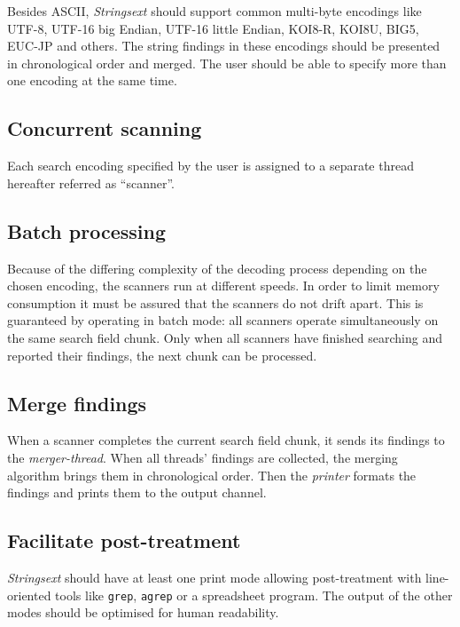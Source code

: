 Besides ASCII, \emph{Strings­ext} should support common multi-byte
encodings like UTF-8, UTF-16 big Endian, UTF-16 little Endian, KOI8-R,
KOI8U, BIG5, EUC-JP and others. The string findings in these encodings
should be presented in chronological order and merged. The user should
be able to spe­cify more than one encoding at the same time.

\hypertarget{req-concurrent}{\subsection{Concurrent
scanning}\label{req-concurrent}}

Each search encoding specified by the user is assigned to a separate
thread hereafter referred as ``scanner''.

\hypertarget{req-batch-processing}{\subsection{Batch
processing}\label{req-batch-processing}}

Because of the differing complexity of the decoding process depending on
the chosen encoding, the scanners run at different speeds. In order to
li­mit memory consumption it must be assured that the scanners do not
drift apart. This is guaranteed by operating in batch mode: all scanners
operate sim­ul­tan­eously on the same search field chunk. Only when all
scanners have finished searching and reported their findings, the next
chunk can be processed.

\hypertarget{req-merge-findings}{\subsection{Merge
findings}\label{req-merge-findings}}

When a scanner completes the current search field chunk, it sends its
findings to the \emph{merger-thread}. When all threads' findings are
collected, the merging algorithm brings them in chronological order.
Then the \emph{printer} formats the findings and prints them to the
output channel.

\hypertarget{req-post-treatment}{\subsection{Facilitate
post-treatment}\label{req-post-treatment}}

\emph{Strings­ext} should have at least one print mode allowing
post-treatment with line-oriented tools like \texttt{grep},
\texttt{agrep} or a spreadsheet program. The output of the other modes
should be optimised for human readability.

